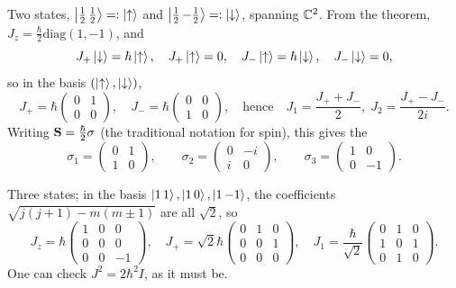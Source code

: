 \documentclass[a4paper]{scrartcl}
\begin{document}
\begin{example}[$j = \tfrac12$]
    Two states, $\ket{\tfrac12\,\tfrac12} =: \ket{\uparrow}$ and $\ket{\tfrac12\,{-\tfrac12}} =: \ket{\downarrow}$, spanning $\mathbb{C}^2$. From the theorem, $J_z = \frac{\hbar}{2}\mathrm{diag}(1,-1)$, and
    $$
    J_+\ket{\downarrow} = \hbar\ket{\uparrow}, \quad J_+\ket{\uparrow} = 0, \quad J_-\ket{\uparrow} = \hbar\ket{\downarrow}, \quad J_-\ket{\downarrow} = 0,
    $$
    so in the basis $(\ket\uparrow, \ket\downarrow)$,
    $$
    J_+ = \hbar\begin{pmatrix}0&1\\0&0\end{pmatrix}, \quad J_- = \hbar\begin{pmatrix}0&0\\1&0\end{pmatrix}, \quad \text{hence} \quad J_1 = \frac{J_++J_-}{2}, \; J_2 = \frac{J_+-J_-}{2i}.
    $$
    Writing $\mathbf{S} = \frac{\hbar}{2}\mathbf{\sigma}$ (the traditional notation for spin), this gives the 
    $$
    \sigma_1 = \begin{pmatrix}0&1\\1&0\end{pmatrix}, \qquad
    \sigma_2 = \begin{pmatrix}0&-i\\i&0\end{pmatrix}, \qquad
    \sigma_3 = \begin{pmatrix}1&0\\0&-1\end{pmatrix}.
    $$
\end{example}

\begin{example}[$j = 1$]
    Three states; in the basis $\ket{1\,1}, \ket{1\,0}, \ket{1\,{-1}}$, the coefficients $\sqrt{j(j+1)-m(m\pm1)}$ are all $\sqrt2$, so
    $$
    J_z = \hbar\begin{pmatrix}1&0&0\\0&0&0\\0&0&-1\end{pmatrix}, \quad
    J_+ = \sqrt2 \hbar\begin{pmatrix}0&1&0\\0&0&1\\0&0&0\end{pmatrix}, \quad
    J_1 = \frac{\hbar}{\sqrt2}\begin{pmatrix}0&1&0\\1&0&1\\0&1&0\end{pmatrix}.
    $$
    One can check $J^2 = 2\hbar^2 I$, as it must be.
\end{example}
\end{document}
